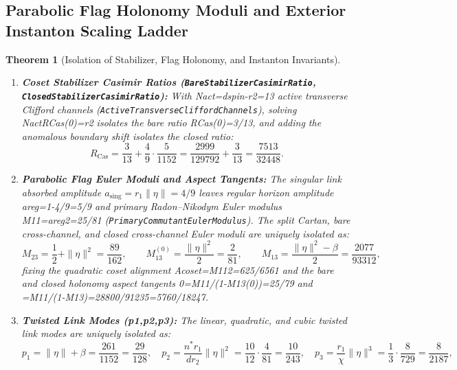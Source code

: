 \documentclass[11pt,reqno]{amsart}
\newtheorem{theorem}{Theorem}[section]
\theoremstyle{definition}
\theoremstyle{remark}
\begin{document}
\subsection{Parabolic Flag Holonomy Moduli and Exterior Instanton Scaling Ladder}

\begin{theorem}[Isolation of Stabilizer, Flag Holonomy, and Instanton Invariants]
\label{thm:holonomy_instanton}
\begin{enumerate}[label=(\roman*)]
  \item \textbf{Coset Stabilizer Casimir Ratios (\texttt{BareStabilizerCasimirRatio}, \texttt{ClosedStabilizerCasimirRatio}):} With Nact=dspin-r2=13 active transverse Clifford channels (\texttt{ActiveTransverseCliffordChannels}), solving NactRCas(0)=r2 isolates the bare ratio RCas(0)=3/13, and adding the anomalous boundary shift  isolates the closed ratio:
  \begin{equation}
    R_{\mathrm{Cas}} = \frac{3}{13} + \frac{4}{9}\cdot\frac{5}{1152} = \frac{2999}{129792} + \frac{3}{13} = \frac{7513}{32448}.
  \end{equation}
  \item \textbf{Parabolic Flag Euler Moduli and Aspect Tangents:} The singular link absorbed amplitude $a_{\mathrm{sing}} = r_1 \|\eta\| = 4/9$ leaves regular horizon amplitude areg=1-4/9=5/9 and primary Radon--Nikodym Euler modulus M11=areg2=25/81 (\texttt{PrimaryCommutantEulerModulus}). The split Cartan, bare cross-channel, and closed cross-channel Euler moduli are uniquely isolated as:
  \begin{equation}
    M_{23} = \frac{1}{2} + \|\eta\|^2 = \frac{89}{162}, \qquad
    M_{13}^{(0)} = \frac{\|\eta\|^2}{2} = \frac{2}{81}, \qquad
    M_{13} = \frac{\|\eta\|^2 - \beta}{2} = \frac{2077}{93312},
  \end{equation}
  fixing the quadratic coset alignment Acoset=M112=625/6561 and the bare and closed holonomy aspect tangents 0=M11/(1-M13(0))=25/79 and =M11/(1-M13)=28800/91235=5760/18247.
  \item \textbf{Twisted Link Modes (p1,p2,p3):} The linear, quadratic, and cubic twisted link modes are uniquely isolated as:
  \begin{equation}
    p_1 = \|\eta\| + \beta = \frac{261}{1152} = \frac{29}{128}, \quad
    p_2 = \frac{n^* r_1}{d r_2}\|\eta\|^2 = \frac{10}{12}\cdot\frac{4}{81} = \frac{10}{243}, \quad
    p_3 = \frac{r_1}{\chi}\|\eta\|^3 = \frac{1}{3}\cdot\frac{8}{729} = \frac{8}{2187},
  \end{equation}

\end{enumerate}
\end{theorem}
\end{document}
